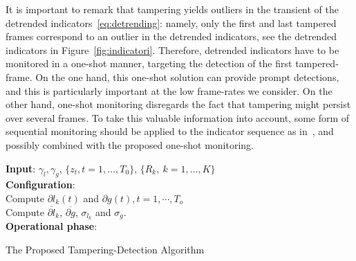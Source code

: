 \documentclass{llncs}
\begin{document}
It is important to remark that tampering yields outliers in the transient of the detrended indicators~\eqref{eq:detrending}: namely, only the first and last tampered frames correspond to an outlier in the detrended indicators, see the detrended indicators in Figure~\ref{fig:indicatori}. Therefore, detrended indicators have to be monitored in a one-shot manner, targeting the detection of the first tampered-frame. On the one hand, this one-shot solution can provide prompt detections, and this is particularly important at the low frame-rates we consider. On the other hand, one-shot monitoring disregards the fact that tampering might persist over several frames. To take this valuable information into account, some form of sequential monitoring should be applied to the indicator sequence as in~\cite{alippi2010detecting}, and possibly combined with the proposed one-shot monitoring.

\begin{algorithm}[t]
	\LinesNumbered
	\textbf{Input}: $\gamma_l, \gamma_g$, $\{z_t, t = 1, \dots, T_{0}\}$, $\{R_k, \ k=1,\dots,K\}$ \\
	\textbf{Configuration}:\\
	 Compute $\partial l_k(t)$ and $\partial g(t), t = 1, \cdots, T_o$\\ 
	 Compute $\overline{\partial l}_k$, $\overline{\partial g}$, $\sigma_{l_k}$ and $\sigma_{g}$.\\
	
	\textbf{Operational phase}:\\
	    
	\caption{The Proposed Tampering-Detection Algorithm}
	\label{alg:DISPL}
\end{algorithm}
\end{document}
